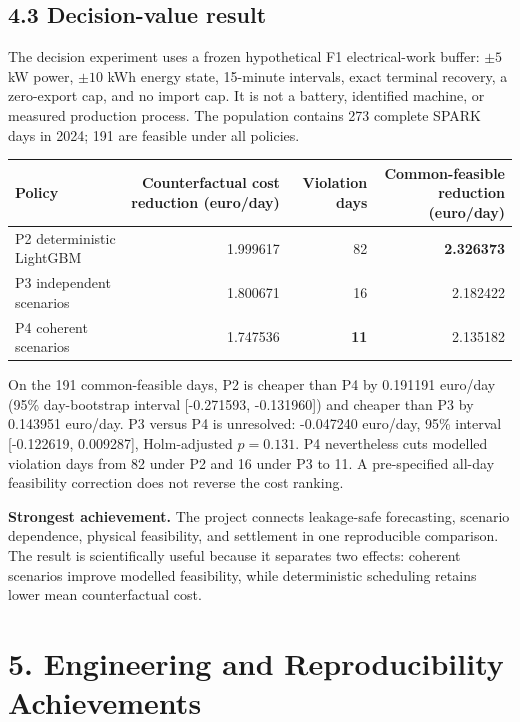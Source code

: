 \documentclass[10pt,a4paper]{article}
\newcommand{\infobox}[2]{%
  \begin{center}
  \colorbox{#1}{\begin{minipage}{0.95\textwidth}\small #2\end{minipage}}
  \end{center}}
\begin{document}
\subsection*{4.3 Decision-value result}

The decision experiment uses a frozen hypothetical F1 electrical-work buffer:
$\pm5$ kW power, $\pm10$ kWh energy state, 15-minute intervals, exact terminal
recovery, a zero-export cap, and no import cap. It is not a battery, identified
machine, or measured production process. The population contains 273 complete
SPARK days in 2024; 191 are feasible under all policies.

\begin{tabularx}{\textwidth}{Xrrr}
\toprule
Policy & Counterfactual cost reduction (euro/day) & Violation days &
Common-feasible reduction (euro/day)\\
\midrule
P2 deterministic LightGBM & 1.999617 & 82 & \textbf{2.326373}\\
P3 independent scenarios & 1.800671 & 16 & 2.182422\\
P4 coherent scenarios & 1.747536 & \textbf{11} & 2.135182\\
\bottomrule
\end{tabularx}

On the 191 common-feasible days, P2 is cheaper than P4 by 0.191191 euro/day
(95\% day-bootstrap interval [-0.271593, -0.131960]) and cheaper than P3 by
0.143951 euro/day. P3 versus P4 is unresolved: -0.047240 euro/day, 95\%
interval [-0.122619, 0.009287], Holm-adjusted $p=0.131$. P4 nevertheless cuts
modelled violation days from 82 under P2 and 16 under P3 to 11. A pre-specified
all-day feasibility correction does not reverse the cost ranking.

\infobox{greenbox}{\textbf{Strongest achievement.} The project connects
leakage-safe forecasting, scenario dependence, physical feasibility, and
settlement in one reproducible comparison. The result is scientifically useful
because it separates two effects: coherent scenarios improve modelled
feasibility, while deterministic scheduling retains lower mean counterfactual
cost.}

\section*{5. Engineering and Reproducibility Achievements}
\end{document}
